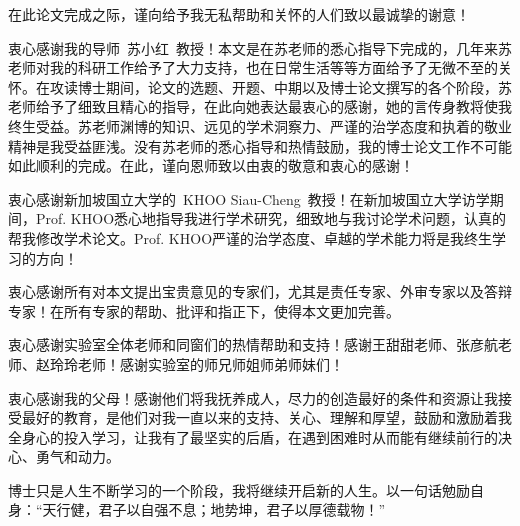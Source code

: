 

在此论文完成之际，谨向给予我无私帮助和关怀的人们致以最诚挚的谢意！

衷心感谢我的导师~苏小红~教授！本文是在苏老师的悉心指导下完成的，几年来苏老师对我的科研工作给予了大力支持，也在日常生活等等方面给予了无微不至的关怀。在攻读博士期间，论文的选题、开题、中期以及博士论文撰写的各个阶段，苏老师给予了细致且精心的指导，在此向她表达最衷心的感谢，她的言传身教将使我终生受益。苏老师渊博的知识、远见的学术洞察力、严谨的治学态度和执着的敬业精神是我受益匪浅。没有苏老师的悉心指导和热情鼓励，我的博士论文工作不可能如此顺利的完成。在此，谨向恩师致以由衷的敬意和衷心的感谢！

衷心感谢新加坡国立大学的~KHOO Siau-Cheng~教授！在新加坡国立大学访学期间，Prof. KHOO悉心地指导我进行学术研究，细致地与我讨论学术问题，认真的帮我修改学术论文。Prof. KHOO严谨的治学态度、卓越的学术能力将是我终生学习的方向！

衷心感谢所有对本文提出宝贵意见的专家们，尤其是责任专家、外审专家以及答辩专家！在所有专家的帮助、批评和指正下，使得本文更加完善。

衷心感谢实验室全体老师和同窗们的热情帮助和支持！感谢王甜甜老师、张彦航老师、赵玲玲老师！感谢实验室的师兄师姐师弟师妹们！

衷心感谢我的父母！感谢他们将我抚养成人，尽力的创造最好的条件和资源让我接受最好的教育，是他们对我一直以来的支持、关心、理解和厚望，鼓励和激励着我全身心的投入学习，让我有了最坚实的后盾，在遇到困难时从而能有继续前行的决心、勇气和动力。

博士只是人生不断学习的一个阶段，我将继续开启新的人生。以一句话勉励自身：“天行健，君子以自强不息；地势坤，君子以厚德载物！”

